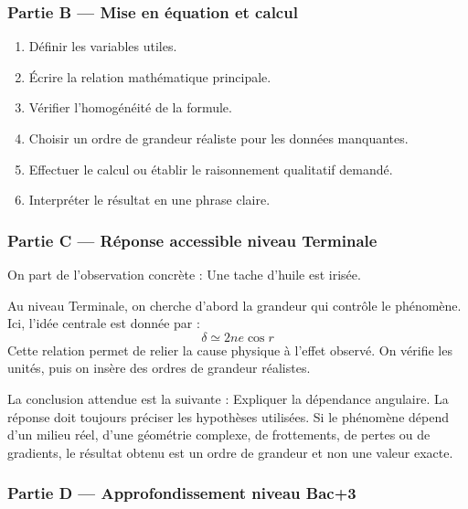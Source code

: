 \documentclass[11pt,a4paper]{article}
\begin{document}
\subsubsection*{Partie B — Mise en équation et calcul}

\begin{enumerate}
  \item Définir les variables utiles.
  \item Écrire la relation mathématique principale.
  \item Vérifier l'homogénéité de la formule.
  \item Choisir un ordre de grandeur réaliste pour les données manquantes.
  \item Effectuer le calcul ou établir le raisonnement qualitatif demandé.
  \item Interpréter le résultat en une phrase claire.
\end{enumerate}

\subsubsection*{Partie C — Réponse accessible niveau Terminale}

\begin{corrigebox}
On part de l'observation concrète : Une tache d'huile est irisée.

Au niveau Terminale, on cherche d'abord la grandeur qui contrôle le phénomène. Ici, l'idée centrale est donnée par :
\[
\delta\simeq2ne\cos r
\]
Cette relation permet de relier la cause physique à l'effet observé. On vérifie les unités, puis on insère des ordres de grandeur réalistes.

La conclusion attendue est la suivante : Expliquer la dépendance angulaire. La réponse doit toujours préciser les hypothèses utilisées. Si le phénomène dépend d'un milieu réel, d'une géométrie complexe, de frottements, de pertes ou de gradients, le résultat obtenu est un ordre de grandeur et non une valeur exacte.
\end{corrigebox}

\subsubsection*{Partie D — Approfondissement niveau Bac+3}
\end{document}
